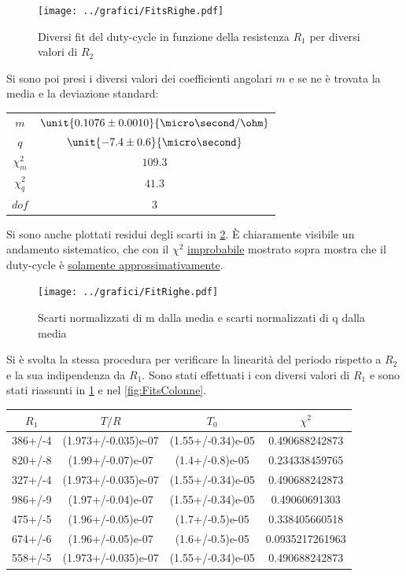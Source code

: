 \documentclass[a4paper,10pt]{article}
\begin{document}
\begin{figure}[H]
	\centering
	\texttt{[image: ../grafici/FitsRighe.pdf]}
	\caption{Diversi fit del duty-cycle in funzione della resistenza $R_1$ per diversi valori di $R_2$}
	\label{fig:FitsRighe}
\end{figure}

Si sono poi presi i diversi valori dei coefficienti angolari $m$ e se ne è trovata la media e la deviazione standard:


\begin{table}[H]
\centering
\begin{tabular}{c|c} 
$m$&$\unit{0.1076 \pm 0.0010}{\micro\second/\ohm}$ \\
$q$&$\unit{-7.4 \pm 0.6}{\micro\second}$ \\
$\chi^2_m$&$109.3$\\
$\chi^2_q$&$41.3$\\
$dof$&$3$\\
\end{tabular}
\end{table}

Si sono anche plottati residui degli scarti in \cref{fig:FitRighe}. \`E chiaramente visibile un andamento sistematico, che con il $\chi^2$ \underline{improbabile} mostrato sopra mostra che il duty-cycle è \underline{solamente approssimativamente}.


\begin{figure}[H]
	\centering
	\texttt{[image: ../grafici/FitRighe.pdf]}
	\caption{Scarti normalizzati di m dalla media e scarti normalizzati di q dalla media}
	\label{fig:FitRighe}
\end{figure}




Si è svolta la stessa procedura per verificare la linearità del periodo rispetto a $R_2$ e la sua indipendenza da $R_1$. Sono stati effettuati i con diversi valori di $R_1$ e sono stati riassunti in \cref{tab:FitsColonne} e nel \cref{fig:FitsColonne}.

\begin{table}[H]
\centering
\begin{tabular}{c|c|c|c} 
$R_1$ & $T/R$ & $T_0$ & $\chi^2$\\
\hline
386+/-4 & (1.973+/-0.035)e-07 & (1.55+/-0.34)e-05 & 0.490688242873\\
820+/-8 & (1.99+/-0.07)e-07 & (1.4+/-0.8)e-05 & 0.234338459765\\
327+/-4 & (1.973+/-0.035)e-07 & (1.55+/-0.34)e-05 & 0.490688242873\\
986+/-9 & (1.97+/-0.04)e-07 & (1.55+/-0.34)e-05 & 0.49060691303\\
475+/-5 & (1.96+/-0.05)e-07 & (1.7+/-0.5)e-05 & 0.338405660518\\
674+/-6 & (1.96+/-0.05)e-07 & (1.6+/-0.5)e-05 & 0.0935217261963\\
558+/-5 & (1.973+/-0.035)e-07 & (1.55+/-0.34)e-05 & 0.490688242873\\
\end{tabular}
\label{tab:FitsColonne}
\end{table}
\end{document}
